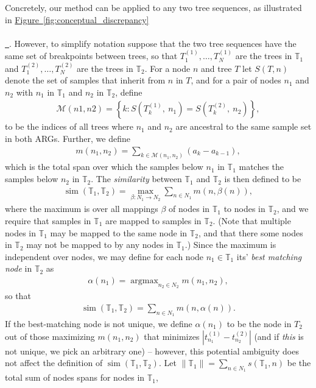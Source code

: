 \documentclass[10pt,twoside,lineno]{gsajnl}
\newcommand{\T}{\mathbb{T}}
\newcommand{\argmax}{\operatorname{argmax}}
\newcommand{\similarity}{\operatorname{sim}}
\newcommand*{\figref}[2][]{%
	\hyperref[{#2}]{%
		Figure~\ref*{#2}%
		\ifx\\#1\\%
		\else
		\,#1%
		\fi
	}%
}
\begin{document}
Concretely, our method can be applied to any two tree sequences,
as illustrated in \figref{fig:conceptual_discrepancy}.
However, to simplify notation suppose that the two tree sequences have the same set of breakpoints
between trees,
so that $T_1^{(1)}, \ldots, T_N^{(1)}$ are the trees in $\T_1$
and $T_1^{(2)}, \ldots, T_N^{(2)}$ are the trees in $\T_2$.
For a node $n$ and tree $T$
let $S(T, n)$ denote the set of samples that inherit from $n$ in $T$,
and for a pair of nodes $n_1$ and $n_2$ with $n_1$ in $\T_1$ and $n_2$ in $\T_2$,
define
\begin{align*}
	\mathcal{M}(n1, n2) = \left\{ k : S\left(T^{(1)}_k,\ n_1\right) = S\left(T^{(2)}_k,\ n_2\right) \right\},
\end{align*}
to be the indices of all trees where $n_1$ and $n_2$ are ancestral to the same sample set in both ARGs.
Further, we define
\begin{align*}
    m(n_1, n_2)
    =
    \sum_{k\in \mathcal{M}(n_1, n_2)} (a_k - a_{k-1}) ,  
\end{align*}
which is the total span over which the samples below $n_1$ in $\T_1$
matches the samples below $n_2$ in $\T_2$.
The \emph{similarity} between $\T_1$ and $\T_2$ is then defined to be
\begin{align*}
    \similarity(\T_1, \T_2)
    =
    \max_{\beta:N_1 \to N_2} \sum_{n \in N_1} m(n, \beta(n)) ,
\end{align*}
where the maximum is over all mappings $\beta$ of nodes in $\T_1$ to nodes in $\T_2$, and we require that samples in $\T_1$ are mapped to samples in $\T_2$.
(Note that multiple nodes in $\T_1$ may be mapped to the same node in $\T_2$,
and that there some nodes in $\T_2$ may not be mapped to by any nodes in $\T_1$.)
Since the maximum is independent over nodes, we may define for each node $n_1 \in \T_1$
its' \emph{best matching node} in $\T_2$ as
\begin{align*}
    \alpha(n_1) = \argmax_{n_2 \in N_2} m(n_1, n_2) ,
\end{align*}
so that
\begin{align*}
    \similarity(\T_1, \T_2)
    =
    \sum_{n \in N_1} m(n, \alpha(n)) .
\end{align*}
If the best-matching node is not unique, we define $\alpha(n_1)$ to be the node in $T_2$
out of those maximizing $m(n_1, n_2)$ that minimizes $|t^{(1)}_{n_1} - t^{(2)}_{n_2}|$
(and if \emph{this} is not unique, we pick an arbitrary one) --
however, this potential ambiguity does not affect the definition of $\similarity(\T_1, \T_2)$.
Let $\|\T_1\|=\sum_{n\in N_1}s(\T_1,n)$ be the total sum of nodes spans for nodes in $\T_1$,
\end{document}
